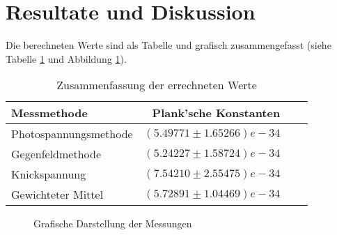 \section{Resultate und Diskussion}

Die berechneten Werte sind  als  Tabelle  und  grafisch  zusammengefasst  (siehe
Tabelle \ref{tab:zusammenfassung} und  Abbildung \ref{fig:einzelmessungen}).

\begin{table}[ht!]
    \begin{center}
        \caption{Zusammenfassung der errechneten Werte}
        \label{tab:zusammenfassung}
        \begin{tabular}{lrrr}
            \toprule
            Messmethode & Plank'sche Konstanten \\
            \midrule
            Photospannungsmethode & $\left(5.49771 \pm 1.65266\right)e-34$ \\
            Gegenfeldmethode      & $\left(5.24227 \pm 1.58724\right)e-34$ \\
            Knickspannung         & $\left(7.54210 \pm 2.55475\right)e-34$ \\
            \midrule
            Gewichteter Mittel    & $\left(5.72891 \pm 1.04469\right)e-34$ \\
            \bottomrule
        \end{tabular}
    \end{center}
\end{table}

\begin{figure}[ht!]
    \centering
    \caption{Grafische Darstellung der Messungen}
    \label{fig:einzelmessungen}
\end{figure}

